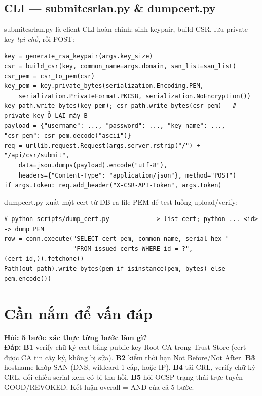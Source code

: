\documentclass[12pt,a4paper]{article}
\newcommand{\code}[1]{{\ttfamily\small\def\_{\textunderscore\discretionary{}{}{}}#1}}
\begin{document}
\subsection{CLI --- \code{submit\_csr\_lan.py} \& \code{dump\_cert.py}}

\code{submit\_csr\_lan.py} là client CLI hoàn chỉnh: sinh keypair, build CSR, lưu
private key \emph{tại chỗ}, rồi POST:

\begin{Verbatim}
key = generate_rsa_keypair(args.key_size)
csr = build_csr(key, common_name=args.domain, san_list=san_list)
csr_pem = csr_to_pem(csr)
key_pem = key.private_bytes(serialization.Encoding.PEM,
    serialization.PrivateFormat.PKCS8, serialization.NoEncryption())
key_path.write_bytes(key_pem); csr_path.write_bytes(csr_pem)   # private key Ở LẠI máy B
payload = {"username": ..., "password": ..., "key_name": ..., "csr_pem": csr_pem.decode("ascii")}
req = urllib.request.Request(args.server.rstrip("/") + "/api/csr/submit",
    data=json.dumps(payload).encode("utf-8"),
    headers={"Content-Type": "application/json"}, method="POST")
if args.token: req.add_header("X-CSR-API-Token", args.token)
\end{Verbatim}

\code{dump\_cert.py} xuất một cert từ DB ra file PEM để test luồng upload/verify:

\begin{Verbatim}[numbers=none]
# python scripts/dump_cert.py            -> list cert; python ... <id> -> dump PEM
row = conn.execute("SELECT cert_pem, common_name, serial_hex "
                   "FROM issued_certs WHERE id = ?", (cert_id,)).fetchone()
Path(out_path).write_bytes(pem if isinstance(pem, bytes) else pem.encode())
\end{Verbatim}

\section{Cần nắm để vấn đáp}

\begin{qabox}
\textbf{Hỏi: 5 bước xác thực từng bước làm gì?}\\
\textbf{Đáp:} \textbf{B1} verify chữ ký cert bằng public key Root CA trong Trust
Store (cert được CA tin cậy ký, không bị sửa). \textbf{B2} kiểm thời hạn Not
Before/Not After. \textbf{B3} hostname khớp SAN (DNS, wildcard 1 cấp, hoặc IP).
\textbf{B4} tải CRL, verify chữ ký CRL, đối chiếu serial xem có bị thu hồi.
\textbf{B5} hỏi OCSP trạng thái trực tuyến GOOD/REVOKED. Kết luận
\code{overall = AND} của cả 5 bước.
\end{qabox}
\end{document}
